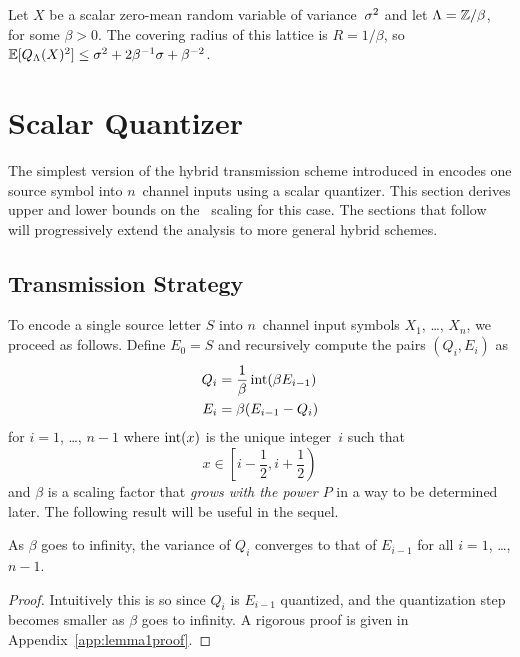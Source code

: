 \begin{example}
  Let $X$ be a scalar zero-mean random variable of variance~${\sigma^2}$ and let
  $\Lambda = \mathbb{Z} / \beta$, for some $\beta > 0$. The covering radius of this
  lattice is $R = 1/\beta$, so $\mathbb{E}[{Q_{\Lambda}}(X)^2] \le {\sigma^2} + 2 \beta^{-1} \sigma +
  \beta^{-2}$.
\end{example}


\section{Scalar Quantizer}\label{sec:scalarquant}

The simplest version of the hybrid transmission scheme introduced in
 encodes one source symbol into $n$~channel inputs using a
scalar quantizer. This section derives upper and lower bounds on the \sdr\
scaling for this case. The sections that follow will progressively extend the
analysis to more general hybrid schemes.


\subsection{Transmission Strategy}\label{sec:commscheme}

To encode a single source letter $S$ into $n$~channel input symbols $X_1$,
\dots, $X_n$, we proceed as follows. Define $E_0 = S$ and recursively compute
the pairs $(Q_i, E_i)$ as
\begin{align}
  Q_i &= \frac{1}{\beta} \operatorname{int}(\beta E_{i-1}) \nonumber \\
  E_i &= \beta (E_{i-1} - Q_i) \label{eq:QEdef}
\end{align}
for $i = 1$, \dots, $n-1$ where $\operatorname{int}(x)$ is the unique integer~$i$ such that
\begin{equation*}
  x \in \left[ i - \frac12 , i + \frac12 \right)
\end{equation*}
and $\beta$ is a scaling factor that \emph{grows with the power $P$}
in a way to be determined later.  The following result will be useful in the
sequel.
\begin{lemma}
  \label{lem:qvarconvergence}
  As $\beta$ goes to infinity, the variance of $Q_i$ converges to that of
  $E_{i-1}$ for all $i = 1$, \dots, $n-1$. 
\end{lemma}

\begin{proof}
  Intuitively this is so since $Q_i$ is $E_{i-1}$ quantized, and the
  quantization step becomes smaller as $\beta$ goes to infinity.  A rigorous
  proof is given in Appendix~\ref{app:lemma1proof}.
\end{proof}

